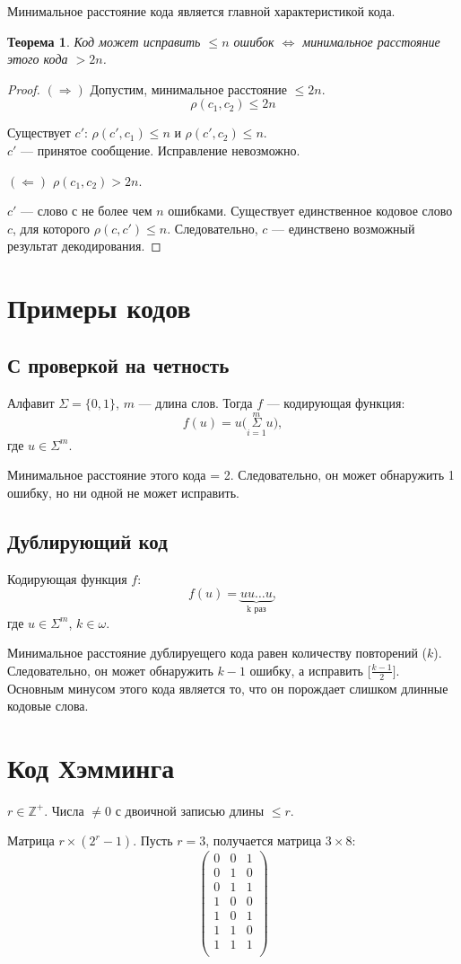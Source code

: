 \documentclass[a4paper,14pt, draft]{report}
\newtheorem{theorem}{Теорема}
\begin{document}
Минимальное расстояние кода является главной характеристикой кода.

\begin{theorem}Код может исправить $\le n$ ошибок $\Leftrightarrow$ минимальное расстояние этого кода $>2n$.
\end{theorem}
\begin{proof}$(\Rightarrow)$ Допустим, минимальное расстояние $\le 2n$. $$\rho(c_1, c_2)\le 2n$$

Существует $c'$: $\rho(c', c_1)\le n$ и $\rho(c', c_2)\le n$.\\$c'$ --- принятое сообщение. Исправление невозможно.

$(\Leftarrow)$ $\rho(c_1, c_2) > 2n$.

$c'$ --- слово с не более чем $n$ ошибками. Существует единственное кодовое слово $c$, для которого $\rho(c, c')\le n$. Следовательно, $c$ --- единствено возможный результат декодирования.
\end{proof}
\section{Примеры кодов}
\subsection{С проверкой на четность}
Алфавит $\Sigma = \{0, 1\}$, $m$ --- длина слов. Тогда $f$ --- кодирующая функция: $$f(u) = u \Big(\overset{m}{\underset{i=1}{\Sigma}} u\Big),$$ где $u\in\Sigma^m$.

Минимальное расстояние этого кода = 2. Следовательно, он может обнаружить 1 ошибку, но ни одной не может исправить.
\subsection{Дублирующий код}
Кодирующая функция $f$: $$f(u) = \underbrace{uu\ldots u}_\text{k раз},$$ где $u\in\Sigma^m$, $k\in\omega$.

Минимальное расстояние дублируещего кода равен количеству повторений ($k$). Следовательно, он может обнаружить $k-1$ ошибку, а исправить $\big[\frac{k-1}{2}\big]$. Основным минусом этого кода является то, что он порождает слишком длинные кодовые слова.
\section{Код Хэмминга}
$r\in\mathbb{Z^+}$. Числа $\neq0$ с двоичной записью длины $\le r$.

Матрица $r\times(2^r-1)$. Пусть $r = 3$, получается матрица $3\times8$:\[
\begin{pmatrix}
    0&0&1\\
    0&1&0\\
    0&1&1\\
    1&0&0\\
    1&0&1\\
    1&1&0\\
    1&1&1\\
\end{pmatrix}\]
\end{document}

